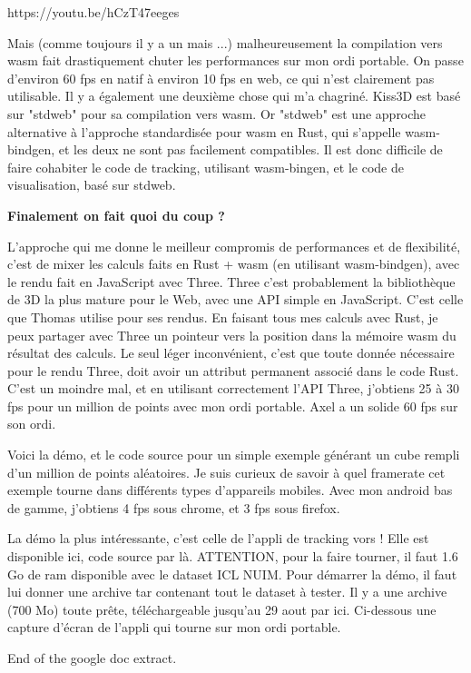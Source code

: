 https://youtu.be/hCzT47eeges


Mais (comme toujours il y a un mais ...) malheureusement la compilation vers wasm fait drastiquement chuter les performances sur mon ordi portable. On passe d'environ 60 fps en natif à environ 10 fps en web, ce qui n'est clairement pas utilisable. Il y a également une deuxième chose qui m'a chagriné. Kiss3D est basé sur "stdweb" pour sa compilation vers wasm. Or "stdweb" est une approche alternative à l'approche standardisée pour wasm en Rust, qui s'appelle wasm-bindgen, et les deux ne sont pas facilement compatibles. Il est donc difficile de faire cohabiter le code de tracking, utilisant wasm-bingen, et le code de visualisation, basé sur stdweb.

\textbf{Finalement on fait quoi du coup ?}

L'approche qui me donne le meilleur compromis de performances et de flexibilité, c'est de mixer les calculs faits en Rust + wasm (en utilisant wasm-bindgen), avec le rendu fait en JavaScript avec Three. Three c'est probablement la bibliothèque de 3D la plus mature pour le Web, avec une API simple en JavaScript. C’est celle que Thomas utilise pour ses rendus. En faisant tous mes calculs avec Rust, je peux partager avec Three un pointeur vers la position dans la mémoire wasm du résultat des calculs. Le seul léger inconvénient, c'est que toute donnée nécessaire pour le rendu Three, doit avoir un attribut permanent associé dans le code Rust. C'est un moindre mal, et en utilisant correctement l'API Three, j'obtiens 25 à 30 fps pour un million de points avec mon ordi portable. Axel a un solide 60 fps sur son ordi.

Voici la démo, et le code source pour un simple exemple générant un cube rempli d'un million de points aléatoires. Je suis curieux de savoir à quel framerate cet exemple tourne dans différents types d'appareils mobiles. Avec mon android bas de gamme, j'obtiens 4 fps sous chrome, et 3 fps sous firefox.

La démo la plus intéressante, c'est celle de l'appli de tracking vors ! Elle est disponible ici, code source par là. ATTENTION, pour la faire tourner, il faut 1.6 Go de ram disponible avec le dataset ICL NUIM. Pour démarrer la démo, il faut lui donner une archive tar contenant tout le dataset à tester. Il y a une archive (700 Mo) toute prête, téléchargeable jusqu'au 29 aout par ici. Ci-dessous une capture d’écran de l’appli qui tourne sur mon ordi portable.

\alert{End of the google doc extract.}

